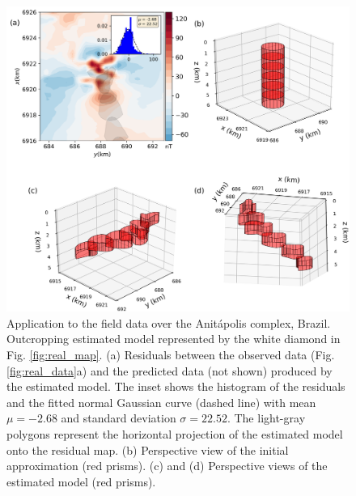 \begin{figure}
    \centering
    \includegraphics[width=\linewidth]{figures/real_results_white_diamond.png}
    \caption{Application to the field data over the Anit{\'a}polis complex, Brazil.
    Outcropping estimated model 
    represented by the white diamond in Fig. \ref{fig:real_map}. 
    (a) Residuals between the observed data (Fig. \ref{fig:real_data}a) and the 
    predicted data (not shown) produced by the estimated model. 
    The inset shows the histogram of the residuals and the fitted normal 
    Gaussian curve (dashed line) with mean $\mu = -2.68$ and standard deviation  $\sigma = 22.52$.
    The light-gray polygons represent the horizontal projection of the estimated 
    model onto the residual map. 
    (b) Perspective view of the initial approximation (red prisms). 
    (c) and (d) Perspective views of the estimated model (red prisms).}
    \label{fig:real_result}
\end{figure}